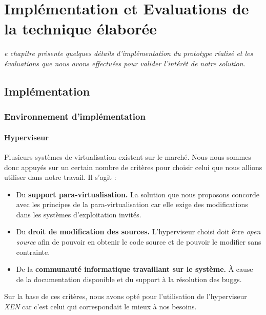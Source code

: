 \let\textcircled=\pgftextcircled
\chapter{Implémentation et Evaluations de la technique élaborée}
\label{chap:implem_eval}

\textit{e chapitre présente quelques détails d’implémentation du prototype réalisé et les évaluations que nous avons effectuées pour valider l’intérêt de notre solution.}

\minitoc

\newpage  
\section{Implémentation}
\subsection{Environnement d'implémentation}

\subsubsection{Hyperviseur}

Plusieurs systèmes de virtualisation existent sur le marché. Nous nous sommes donc appuyés sur un certain nombre de critères pour choisir celui que nous allions utiliser dans notre travail. Il s'agit :
\begin{itemize}[label=]
    \item Du \textbf{support para-virtualisation.} La solution que nous proposons concorde avec les principes de la para-virtualisation car elle exige des modifications dans les systèmes d'exploitation invités.
    \item Du \textbf{droit de modification des sources.} L'hyperviseur choisi doit être \textit{open source} afin de pouvoir en obtenir le code source et de pouvoir le modifier sans contrainte.
    \item De la \textbf{communauté informatique travaillant sur le système.} À cause de la documentation disponible et du support à la résolution des buggs.
\end{itemize}
\noindent Sur la base de ces critères, nous avons opté pour l'utilisation de l'hyperviseur \emph{XEN} \cite{article2} car c'est celui qui correspondait le mieux à nos besoins.

